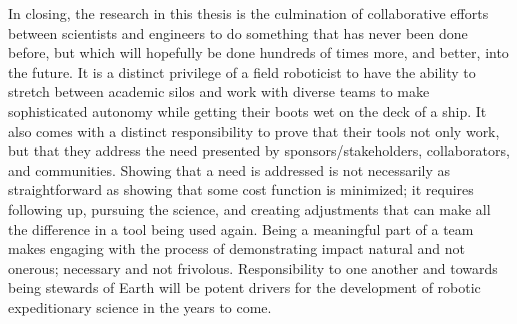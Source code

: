 In closing, the research in this thesis is the culmination of collaborative efforts between scientists and engineers to do something that has never been done before, but which will hopefully be done hundreds of times more, and better, into the future. It is a distinct privilege of a field roboticist to have the ability to stretch between academic silos and work with diverse teams to make sophisticated autonomy while getting their boots wet on the deck of a ship. It also comes with a distinct responsibility to prove that their tools not only work, but that they address the need presented by sponsors/stakeholders, collaborators, and communities. Showing that a need is addressed is not necessarily as straightforward as showing that some cost function is minimized; it requires following up, pursuing the science, and creating adjustments that can make all the difference in a tool being used again. Being a meaningful part of a team makes engaging with the process of demonstrating impact natural and not onerous; necessary and not frivolous. Responsibility to one another and towards being stewards of Earth will be potent drivers for the development of robotic expeditionary science in the years to come.

